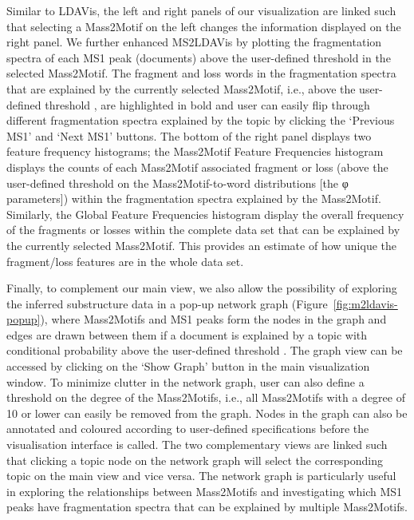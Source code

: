 Similar to LDAVis, the left and right panels of our visualization are linked such that selecting a Mass2Motif on the left changes the information displayed on the right panel. We further enhanced MS2LDAVis by plotting the fragmentation spectra of each MS1 peak (documents) above the user-defined threshold  in the selected Mass2Motif. The fragment and loss words in the fragmentation spectra that are explained by the currently selected Mass2Motif, i.e., above the user-defined threshold , are highlighted in bold and user can easily flip through different fragmentation spectra explained by the topic by clicking the ‘Previous MS1’ and ‘Next MS1’ buttons. The bottom of the right panel displays two feature frequency histograms; the Mass2Motif Feature Frequencies histogram displays the counts of each Mass2Motif associated fragment or loss (above the user-defined threshold  on the Mass2Motif-to-word distributions [the φ parameters]) within the fragmentation spectra explained by the Mass2Motif. Similarly, the Global Feature Frequencies histogram display the overall frequency of the fragments or losses within the complete data set that can be explained by the currently selected Mass2Motif. This provides an estimate of how unique the fragment/loss features are in the whole data set.

Finally, to complement our main view, we also allow the possibility of exploring the inferred substructure data in a pop-up network graph (Figure~\ref{fig:m2ldavis-popup}), where Mass2Motifs and MS1 peaks form the nodes in the graph and edges are drawn between them if a document is explained by a topic with conditional probability above the user-defined threshold . The graph view can be accessed by clicking on the ‘Show Graph’ button in the main visualization window. To minimize clutter in the network graph, user can also define a threshold on the degree of the Mass2Motifs, i.e., all Mass2Motifs with a degree of 10 or lower can easily be removed from the graph. Nodes in the graph can also be annotated and coloured according to user-defined specifications before the visualisation interface is called. The two complementary views are linked such that clicking a topic node on the network graph will select the corresponding topic on the main view and vice versa. The network graph is particularly useful in exploring the relationships between Mass2Motifs and investigating which MS1 peaks have fragmentation spectra that can be explained by multiple Mass2Motifs.

